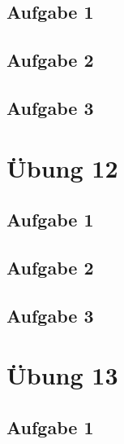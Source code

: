 \documentclass[a4paper]{article}
\begin{document}
\subsection{Aufgabe 1}
\textit{}

\subsection{Aufgabe 2}
\textit{}


\subsection{Aufgabe 3}
\textit{}




\newpage
\section{Übung 12}
\subsection{Aufgabe 1}
\textit{}

\subsection{Aufgabe 2}
\textit{}


\subsection{Aufgabe 3}
\textit{}




\newpage
\section{Übung 13}
\subsection{Aufgabe 1}
\textit{}
\end{document}
